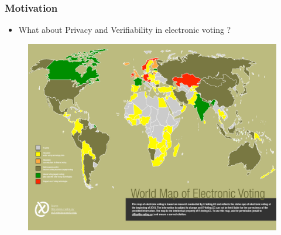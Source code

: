 \documentclass{beamer}
\begin{document}
\begin{frame}
\frametitle{Motivation}
\begin{itemize}
\item What about Privacy and Verifiability in electronic voting ?
\end{itemize}
\begin{figure}
	\begin{center}
	\includegraphics[scale=0.30]{e-voting_worldmap_2015.pdf}
	\end{center}
  \end{figure}
\end{frame}
\end{document}
